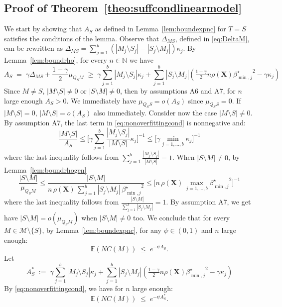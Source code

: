 \documentclass[aos]{imsart}
\theoremstyle{plain}
\newcommand{\E}{\mathbb{E}}
\newcommand{\N}{\mathbb{N}}
\newcommand{\bs}{\boldsymbol}
\begin{document}
\subsection{Proof of Theorem~\ref{theo:suffcondlinearmodel}} We start by showing that $A_S$ as defined in Lemma~\ref{lem:boundexpnc} for $T=S$ satisfies the conditions of the lemma. Observe that $\Delta_{MS}$, defined in \eqref{eq:DeltaM}, can be rewritten as $\Delta_{MS}=\sum_{j=1}^b(|M_j\setminus S_j|-|S_j\setminus M_j|)\kappa_j$. By  Lemma~\ref{lem:boundrho}, for every $n\in \N$ we have 
\begin{equation}\label{eq:nonoverfittingcond}
   A_S\;=\; \gamma \Delta_{MS}+\frac{1-\gamma}{2}\mu_{Q_SM}\;\geq\; \gamma\sum_{j=1}^b|M_j \setminus S_j|\kappa_j + \sum_{j=1}^b |S_j\setminus M_j |\left(\tfrac{1-\gamma}{2} n \rho(\bs X) {\beta^{\star}_{\min,j}}^{2} - \gamma\kappa_j\right) 
\end{equation} 
Since $M\neq S$, $|M\setminus S|\neq0$ or $|S\setminus M|\neq0$, then by assumptions A6 and A7, for $n$ large enough $A_S>0$. We immediately have $\mu_{Q_S S}=o(A_S)$ since $\mu_{Q_S S}=0$. If $|M\setminus S|=0$, $|M\setminus S|=o(A_S)$ also immediately. Consider now the case $|M\setminus S|\neq 0$. By assumption A7, the last term in \eqref{eq:nonoverfittingcond} is nonnegative and:
$$\frac{|M\setminus S|}{A_S}\leq \bigg[ \gamma\sum_{j=1}^b\frac{|M_j \setminus S_j|}{|M\setminus S|}\kappa_j \bigg]^{-1} \leq \Big[ \gamma\min_{j=1,\ldots,b}\kappa_j \Big]^{-1} $$
where the last inequality follows from $\sum_{j=1}^b\frac{|M_j \setminus S_j|}{|M\setminus S|}=1$.  When $|S\setminus M|\neq0$, by Lemma~\ref{lem:boundrhogen}
$$\frac{|S\setminus M|}{\mu_{Q_SM}} \leq \frac{|S\setminus M|}{n\,\rho(\bs X)\,\sum_{j=1}^b|S_j\setminus M_j|\,{\beta_{\min,j}^{\star}}^2}\leq \Big[n\,\rho(\bs X)\,\max_{j=1,\ldots,b}{\beta_{\min,j}^{\star}}^2\Big]^{-1}  $$
where the last inequality follows from $\frac{|S\setminus M|}{\sum_{j=1}^b|S_j \setminus M_j|}=1$. By assumption A7, we get have $|S\setminus M|=o(\mu_{Q_SM})$ when $|S\setminus M|\neq 0$ too.
We conclude that for every $M\in \mathcal M\setminus \{S\}$, by Lemma~\ref{lem:boundexpnc}, for any $\psi\in(0,1)$ and $n$ large enough:
$$
\E(NC(M))\;\leq\;e^{-\psi A_S}.
$$
Let 
$$A_S^*\;:=\;\gamma\sum_{j=1}^b|M_j \setminus S_j|\kappa_j + \sum_{j=1}^b |S_j\setminus M_j |\left(\tfrac{1-\gamma}{2} n \rho(\bs X) {\beta^{\star}_{\min,j}}^{2} - \gamma\kappa_j\right) $$
By \eqref{eq:nonoverfittingcond}, we have for $n$ large enough:
\begin{equation}\label{eq:boundexp}
    \E(NC(M))\;\leq\;e^{-\psi A_S^*}.
\end{equation}
\end{document}

